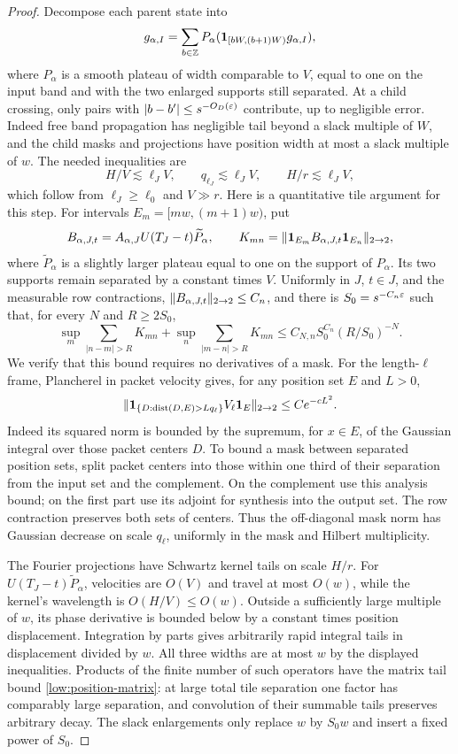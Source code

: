 \begin{proof}
Decompose each parent state into
\[
 g_{\alpha,I}
 =\sum_{b\in\mathbb Z}P_\alpha
                  (\mathbf1_{[bW,(b+1)W)}g_{\alpha,I}),
\]
where $P_\alpha$ is a smooth plateau of width comparable to $V$,
equal to one on the input band and with the two enlarged supports still
separated. At a child crossing, only pairs with
$|b-b'|\leq s^{-O_D(\varepsilon)}$ contribute, up to negligible error.
Indeed free band propagation has negligible tail beyond a slack
multiple of $W$, and the child masks and projections have position
width at most a slack multiple of $w$. The needed inequalities are
\[
 H/V\lesssim\ell_JV,
 \qquad q_{\ell_J}\lesssim\ell_JV,
 \qquad H/r\lesssim\ell_JV,
\]
which follow from $\ell_J\geq\ell_0$ and $V\gg r$.
Here is a quantitative tile argument for this step. For intervals
$E_m=[mw,(m+1)w)$, put
\[
 B_{\alpha,J,t}=A_{\alpha,J}U(T_J-t)\widetilde P_\alpha,
 \qquad
 K_{mn}=\lVert \mathbf1_{E_m}B_{\alpha,J,t}\mathbf1_{E_n}\rVert_{2\to2},
\]
where $\widetilde P_\alpha$ is a slightly larger plateau equal to one
on the support of $P_\alpha$. Its two supports remain separated by
a constant times $V$. Uniformly in $J$, $t\in J$, and the measurable
row contractions, $\lVert B_{\alpha,J,t}\rVert_{2\to2}\leq C_n$, and there
is $S_0=s^{-C_n\varepsilon}$ such that, for every $N$ and $R\geq 2S_0$,
\begin{equation}
 \sup_m\sum_{|n-m|>R}K_{mn}
 +\sup_n\sum_{|m-n|>R}K_{mn}
 \leq C_{N,n}S_0^{C_n}(R/S_0)^{-N}.
 \label{low:position-matrix}
\end{equation}
We verify that this bound requires no derivatives of a mask. For the
length-$\ell$ frame, Plancherel in packet velocity gives, for any
position set $E$ and $L>0$,
\[
 \lVert \mathbf1_{\{D:\operatorname{dist}(D,E)>Lq_\ell\}}
                    V_\ell\mathbf1_E\rVert_{2\to2}
 \leq C e^{-cL^2}.
\]
Indeed its squared norm is bounded by the supremum, for $x\in E$, of
the Gaussian integral over those packet centers $D$. To bound a mask
between separated position sets, split packet centers into those
within one third of their separation from the input set and the
complement. On the complement use this analysis bound; on the first
part use its adjoint for synthesis into the output set. The row
contraction preserves both sets of centers. Thus the off-diagonal
mask norm has Gaussian decrease on scale $q_\ell$, uniformly in the
mask and Hilbert multiplicity.

The Fourier projections have Schwartz kernel tails on scale $H/r$.
For $U(T_J-t)\widetilde P_\alpha$, velocities are $O(V)$ and travel
at most $O(w)$, while the kernel's wavelength is $O(H/V)\leq O(w)$.
Outside a sufficiently large multiple of $w$, its phase derivative
is bounded below by a constant times position displacement.
Integration by parts gives arbitrarily rapid integral tails in
displacement divided by $w$. All three widths are at most $w$ by
the displayed inequalities. Products of the finite number of such
operators have the matrix tail bound \eqref{low:position-matrix}:
at large total tile separation one factor has comparably large
separation, and convolution of their summable tails preserves
arbitrary decay. The slack enlargements only replace $w$ by $S_0w$
and insert a fixed power of $S_0$.


\end{proof}

